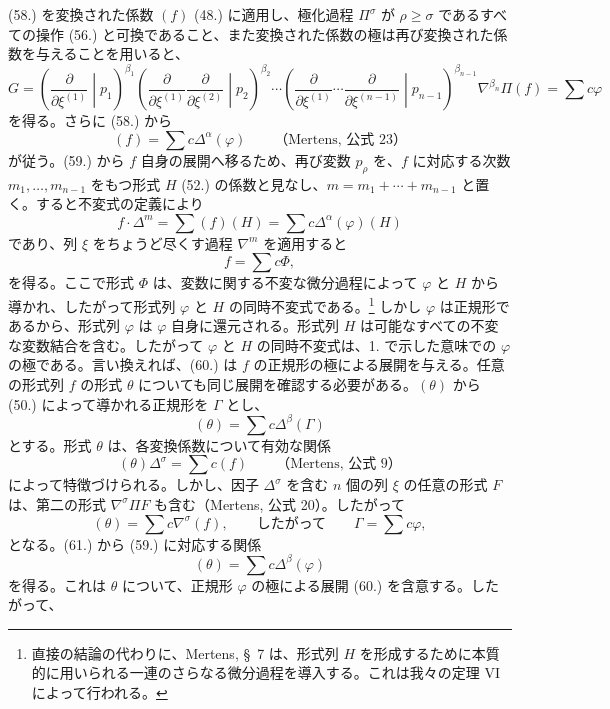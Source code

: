 \documentclass[11pt]{jlreq}
\begin{document}
(58.) を変換された係数 $(f)$ (48.) に適用し、極化過程 $\Pi^\sigma$ が $\rho\ge\sigma$ であるすべての操作 (56.) と可換であること、また変換された係数の極は再び変換された係数を与えることを用いると、
\[
 G=\left(\frac{\partial}{\partial\xi^{(1)}}\middle|p_1\right)^{\beta_1}
 \left(\frac{\partial}{\partial\xi^{(1)}}\frac{\partial}{\partial\xi^{(2)}}\middle|p_2\right)^{\beta_2}
 \cdots
 \left(\frac{\partial}{\partial\xi^{(1)}}\cdots\frac{\partial}{\partial\xi^{(n-1)}}\middle|p_{n-1}\right)^{\beta_{n-1}}
 \nabla^{\beta_n}\Pi(f)=\sum c\varphi
\]
を得る。さらに (58.) から
\begin{equation}
 (f)=\sum c\Delta^\alpha(\varphi)\qquad\text{（Mertens, 公式 23）}
\tag{59}
\end{equation}
が従う。(59.) から $f$ 自身の展開へ移るため、再び変数 $p_\rho$ を、$f$ に対応する次数 $m_1,\ldots,m_{n-1}$ をもつ形式 $H$ (52.) の係数と見なし、$m=m_1+\cdots+m_{n-1}$ と置く。すると不変式の定義により
\[
 f\cdot\Delta^m=\sum(f)(H)=\sum c\Delta^\alpha(\varphi)(H)
\]
であり、列 $\xi$ をちょうど尽くす過程 $\nabla^m$ を適用すると
\begin{equation}
 f=\sum c\Phi,
\tag{60}
\end{equation}
を得る。ここで形式 $\Phi$ は、変数に関する不変な微分過程によって $\varphi$ と $H$ から導かれ、したがって形式列 $\varphi$ と $H$ の同時不変式である。\footnote{直接の結論の代わりに、Mertens, \S\ 7 は、形式列 $H$ を形成するために本質的に用いられる一連のさらなる微分過程を導入する。これは我々の定理 VI によって行われる。} しかし $\varphi$ は正規形であるから、形式列 $\varphi$ は $\varphi$ 自身に還元される。形式列 $H$ は可能なすべての不変な変数結合を含む。したがって $\varphi$ と $H$ の同時不変式は、1. で示した意味での $\varphi$ の極である。言い換えれば、(60.) は $f$ の正規形の極による展開を与える。任意の形式列 $f$ の形式 $\theta$ についても同じ展開を確認する必要がある。$(\theta)$ から (50.) によって導かれる正規形を $\Gamma$ とし、
\begin{equation}
 (\theta)=\sum c\Delta^\beta(\Gamma)
\tag{61}
\end{equation}
とする。形式 $\theta$ は、各変換係数について有効な関係
\[
 (\theta)\Delta^\sigma=\sum c(f)\qquad\text{（Mertens, 公式 9）}
\]
によって特徴づけられる。しかし、因子 $\Delta^\sigma$ を含む $n$ 個の列 $\xi$ の任意の形式 $F$ は、第二の形式 $\nabla^\sigma\Pi F$ も含む（Mertens, 公式 20）。したがって
\[
 (\theta)=\sum c\nabla^\sigma(f),\qquad\text{したがって}\qquad \Gamma=\sum c\varphi,
\]
となる。(61.) から (59.) に対応する関係
\[
 (\theta)=\sum c\Delta^\beta(\varphi)
\]
を得る。これは $\theta$ について、正規形 $\varphi$ の極による展開 (60.) を含意する。したがって、
\end{document}
